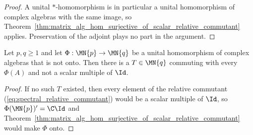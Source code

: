 \begin{proof}
    \leanok
    A unital $*$-homomorphism is in particular a unital homomorphism of
    complex algebras with the same image, so
    Theorem~\ref{thm:matrix_alg_hom_surjective_of_scalar_relative_commutant}
    applies. Preservation of the adjoint plays no part in the argument.
\end{proof}

\begin{theorem}%
    \label{thm:matrix_alg_hom_nonscalar_relative_commutant_of_not_surjective}
    \leanok
    Let $p,q\geq1$ and let $\Phi:\MN{p}\to\MN{q}$ be a unital homomorphism of
    complex algebras that is not onto. Then there is a $T\in\MN{q}$ commuting
    with every $\Phi(A)$ and not a scalar multiple of $\Id$.
\end{theorem}

\begin{proof}
    \leanok
    If no such $T$ existed, then every element of the relative commutant
    (\ref{eq:spectral_relative_commutant}) would be a scalar multiple of
    $\Id$, so $\Phi(\MN{p})'=\C\Id$ and
    Theorem~\ref{thm:matrix_alg_hom_surjective_of_scalar_relative_commutant}
    would make $\Phi$ onto.
\end{proof}
